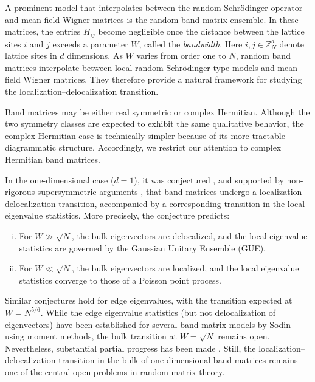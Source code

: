\documentclass[10pt,reqno]{article}
\theoremstyle{plain} %
\theoremstyle{remark}
\numberwithin{equation}{section}
\begin{document}
A prominent model that interpolates between the random Schr\"odinger operator and mean-field Wigner matrices is the random band matrix ensemble. In these matrices, the entries \(H_{ij}\) become negligible once the distance between the lattice sites \(i\) and \(j\) exceeds a parameter \(W\), called the \emph{bandwidth}. Here \(i,j\in\mathbb Z_N^d\) denote lattice sites in \(d\) dimensions. As \(W\) varies from order one to \(N\), random band matrices interpolate between local random Schr\"odinger-type models and mean-field Wigner matrices. They therefore provide a natural framework for studying the localization--delocalization transition.

Band matrices may be either real symmetric or complex Hermitian. Although the two symmetry classes are expected to exhibit the same qualitative behavior, the complex Hermitian case is technically simpler because of its more tractable diagrammatic structure. Accordingly, we restrict our attention to complex Hermitian band matrices.

In the one-dimensional case (\(d=1\)), it was conjectured
\cite{PhysRevLett.64.1851,PhysRevLett.64.5,PhysRevLett.66.986}, and supported by non-rigorous supersymmetric arguments \cite{PhysRevLett.67.2405}, that band matrices undergo a localization--delocalization transition, accompanied by a corresponding transition in the local eigenvalue statistics. More precisely, the conjecture predicts:

\begin{enumerate}[(i)]
    \item For \(W\gg\sqrt N\), the bulk eigenvectors are delocalized, and the local eigenvalue statistics are governed by the Gaussian Unitary Ensemble (GUE).
    \item For \(W\ll\sqrt N\), the bulk eigenvectors are localized, and the local eigenvalue statistics converge to those of a Poisson point process.
\end{enumerate}

Similar conjectures hold for edge eigenvalues, with the transition expected at \(W=N^{5/6}\). While the edge eigenvalue statistics (but not delocalization of eigenvectors) have been established for several band-matrix models by Sodin \cite{Sod2010} using moment methods, the bulk transition at \(W=\sqrt N\) remains open. Nevertheless, substantial partial progress has been made
\cite{BaoErd2015,https://doi.org/10.48550/arxiv.2206.05545,https://doi.org/10.48550/arxiv.2206.06439,erdHos2013local,EK_band1,ErdKno2011,HeMa2018,bourgade2017universality,bourgade2019random,bourgade2020random,yang2021random,Sch2009,PelSchShaSod,Sod2010,SchMT,Sch1,Sch2,Sch3,Sch2014}. Still, the localization--delocalization transition in the bulk of one-dimensional band matrices remains one of the central open problems in random matrix theory.
\end{document}
